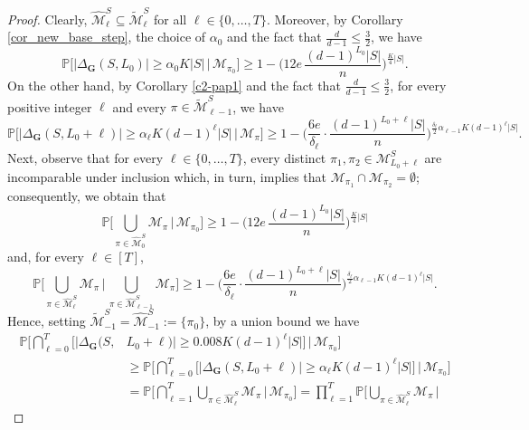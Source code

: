 \documentclass[11pt,leqno]{amsart}
\theoremstyle{remark}
\theoremstyle{plain}
\begin{document}
\begin{proof}
Clearly, $\widehat{\mathcal{M}}^S_\ell\subseteq\widetilde{\mathcal{M}}^S_\ell$
for all $\ell\in \{0,\ldots,T\}$. Moreover, by Corollary \ref{cor_new_base_step}, the choice of $\alpha_0$ and the fact that $\frac{d}{d-1}\leqslant \frac{3}{2}$, we have
\[\mathbb{P}\Big[ \big|\Delta_{\mathbf{G}}(S,L_0)\big|\geqslant \alpha_0 K |S| \, \Big| \, \mathcal{M}_{\pi_0} \Big] \geqslant
  1 - \Big(12e\, \frac{(d-1)^{L_0}|S|}{n} \Big)^{\frac{K}{4} |S|}.\]
On the other hand, by Corollary \ref{c2-pap1} and the fact that $\frac{d}{d-1}\leqslant \frac{3}{2}$,
for every positive integer $\ell$ and every $\pi\in \widetilde{\mathcal{M}}^S_{\ell-1}$, we have
\[ \mathbb{P}\Big[ \big|\Delta_{\mathbf{G}}(S,L_0+\ell)\big| \geqslant  \alpha_\ell K (d-1)^\ell |S| \, \Big| \,
\mathcal{M}_{\pi} \Big]
\geqslant 1 - \Big(\frac{6e}{\delta_\ell} \cdot
\frac{(d-1)^{L_0+\ell}|S|}{n}\Big)^{\frac{\delta_\ell}{2} \alpha_{\ell-1}K (d-1)^{\ell} |S|}.\]
Next, observe that for every $\ell\in\{0,\dots,T\}$, every distinct $\pi_1,\pi_2\in \mathcal{M}^S_{L_0+\ell}$ are incomparable
under inclusion which, in turn, implies that $\mathcal{M}_{\pi_1}\cap\mathcal{M}_{\pi_2}=\emptyset$;
consequently, we obtain that
\[\mathbb{P}\bigg[ \bigcup_{\pi\in \widehat{\mathcal{M}}^S_0} \mathcal{M}_{\pi} \, \bigg| \, \mathcal{M}_{\pi_0} \bigg] \geqslant
  1 - \Big(12e\, \frac{(d-1)^{L_0}|S|}{n}
\Big)^{\frac{K}{4} |S|}\]
and, for every $\ell\in[T]$,
\[\mathbb{P}\bigg[ \bigcup_{\pi\in \widehat{\mathcal{M}}^S_\ell} \mathcal{M}_{\pi} \, \bigg| \,
\bigcup_{\pi\in \widehat{\mathcal{M}}^S_{\ell-1}} \mathcal{M}_{\pi} \bigg]
\geqslant 1 - \Big(\frac{6e}{\delta_\ell} \cdot
\frac{(d-1)^{L_0+\ell}|S|}{n}\Big)^{\frac{\delta_\ell}{2} \alpha_{\ell-1}K (d-1)^{\ell} |S|}.\]
Hence, setting $\widetilde{\mathcal{M}}^S_{-1} = \widehat{\mathcal{M}}^S_{-1} := \{\pi_0\}$,
by a union bound  we have
\begin{align}
\mathbb{P}\bigg[  \bigcap_{\ell=0}^T  \Big[ \big|\Delta_{\mathbf{G}}(S, & L_0+\ell)\big| \geqslant
0.008 K (d-1)^\ell |S|  \big]  \, \bigg| \, \mathcal{M}_{\pi_0}  \bigg] \label{e-pap-p4} \\
&\geqslant
\mathbb{P}\bigg[ \bigcap_{\ell=0}^T \Big[ \big|\Delta_{\mathbf{G}}(S,L_0+\ell)\big| \geqslant
\alpha_\ell K(d-1)^\ell |S| \Big]  \, \bigg| \, \mathcal{M}_{\pi_0} \bigg] \nonumber\\
& = \mathbb{P}\bigg[ \bigcap_{\ell=1}^T \bigcup_{\pi\in \widehat{\mathcal{M}}^S_\ell} \mathcal{M}_{\pi} \, \bigg| \, \mathcal{M}_{\pi_0} \bigg] =
\prod_{\ell=1}^{T} \mathbb{P}\bigg[ \bigcup_{\pi\in\widehat{\mathcal{M}}^S_\ell} \mathcal{M}_{\pi} \, \bigg| \,

\end{align}
\end{proof}
\end{document}
